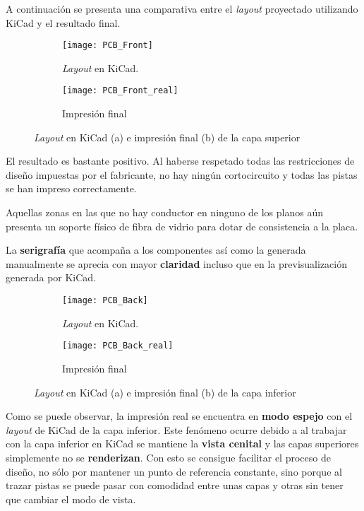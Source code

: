 A continuación se presenta una comparativa entre el \textit{layout} proyectado utilizando KiCad y el resultado final.

\begin{figure}[h]
  \begin{subfigure}[b]{8cm}
   	\centering
    \texttt{[image: PCB\_Front]}
    \caption{\textit{Layout} en KiCad.}
    \label{fig:PCB_Front}
  \end{subfigure}
  \hfill
  \begin{subfigure}[b]{8cm}
  	\centering
    \texttt{[image: PCB\_Front\_real]}
    \caption{Impresión final}
    \label{fig:PCB_Front_real}
  \end{subfigure}
  \caption{\textit{Layout} en KiCad (a) e impresión final (b) de la capa superior}
  \label{fig:PCB_Front_completa}
\end{figure}

El resultado es bastante positivo. Al haberse respetado todas las restricciones de diseño impuestas por el fabricante, no hay ningún cortocircuito y todas las pistas se han impreso correctamente.

Aquellas zonas en las que no hay conductor en ninguno de los planos aún presenta un soporte físico de fibra de vidrio para dotar de consistencia a la placa.

La \textbf{serigrafía} que acompaña a los componentes así como la generada manualmente se aprecia con mayor \textbf{claridad} incluso que en la previsualización generada por KiCad.

\clearpage

\begin{figure}[h]
  \begin{subfigure}[b]{8cm}
   	\centering
    \texttt{[image: PCB\_Back]}
    \caption{\textit{Layout} en KiCad.}
    \label{fig:PCB_Back}
  \end{subfigure}
  \hfill
  \begin{subfigure}[b]{8cm}
  	\centering
    \texttt{[image: PCB\_Back\_real]}
    \caption{Impresión final}
    \label{fig:PCB_Back_real}
  \end{subfigure}
  \caption{\textit{Layout} en KiCad (a) e impresión final (b) de la capa inferior}
  \label{fig:PCB_Back_completa}
\end{figure}

Como se puede observar, la impresión real se encuentra en \textbf{modo espejo} con el \textit{layout} de KiCad de la capa inferior. Este fenómeno ocurre debido a  al trabajar con la capa inferior en KiCad se mantiene la \textbf{vista cenital} y las capas superiores simplemente no se \textbf{renderizan}. Con esto se consigue facilitar el proceso de diseño, no sólo por mantener un punto de referencia constante, sino porque al trazar pistas se puede pasar con comodidad entre unas capas y otras sin tener que cambiar el modo de vista.

